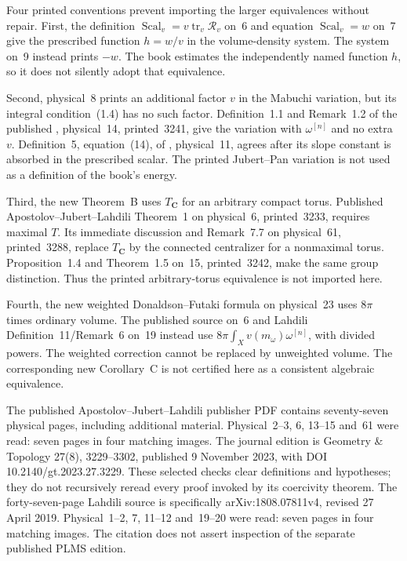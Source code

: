 Four printed conventions prevent importing the larger equivalences
without repair. First, the definition
$\operatorname{Scal}_v=v\operatorname{tr}_v\mathcal R_v$ on~6
and equation $\operatorname{Scal}_v=w$ on~7 give the prescribed
function $h=w/v$ in the volume-density system. The system on~9
instead prints $-w$. The book estimates the independently named
function $h$, so it does not silently adopt that equivalence.

Second, physical~8 prints an additional factor $v$ in the Mabuchi
variation, but its integral condition~(1.4) has no such factor.
Definition~1.1 and Remark~1.2 of the published
\cite{ApostolovJubertLahdili23Published}, physical~14, printed~3241,
give the variation with $\omega^{[n]}$ and no extra $v$.
Definition~5, equation~(14), of
\cite{Lahdili19WeightedScalarV4}, physical~11, agrees after its
slope constant is absorbed in the prescribed scalar. The printed
Jubert--Pan variation is not used as a definition of the book's energy.

Third, the new Theorem~B uses $T_{\mathbf C}$ for an arbitrary
compact torus. Published Apostolov--Jubert--Lahdili Theorem~1 on
physical~6, printed~3233, requires maximal $T$. Its immediate
discussion and Remark~7.7 on physical~61, printed~3288, replace
$T_{\mathbf C}$ by the connected centralizer for a nonmaximal
torus. Proposition~1.4 and Theorem~1.5 on~15, printed~3242,
make the same group distinction. Thus the printed arbitrary-torus
equivalence is not imported here.

Fourth, the new weighted Donaldson--Futaki formula on physical~23
uses $8\pi$ times ordinary volume. The published source on~6
and Lahdili Definition~11/Remark~6 on~19 instead use
$8\pi\int_Xv(m_\omega)\omega^{[n]}$, with divided powers.
The weighted correction cannot be replaced by unweighted volume.
The corresponding new Corollary~C is not certified here as a
consistent algebraic equivalence.

The published Apostolov--Jubert--Lahdili publisher PDF contains
seventy-seven physical pages, including additional material.
Physical~2--3, 6, 13--15 and~61 were read: seven pages in four
matching images. The journal edition is Geometry \& Topology
27(8), 3229--3302, published 9 November 2023, with DOI
10.2140/gt.2023.27.3229. These selected checks clear definitions
and hypotheses; they do not recursively reread every proof invoked
by its coercivity theorem. The forty-seven-page Lahdili source is
specifically arXiv:1808.07811v4, revised 27 April 2019.
Physical~1--2, 7, 11--12 and~19--20 were read: seven pages in
four matching images. The citation does not assert inspection of
the separate published PLMS edition.

